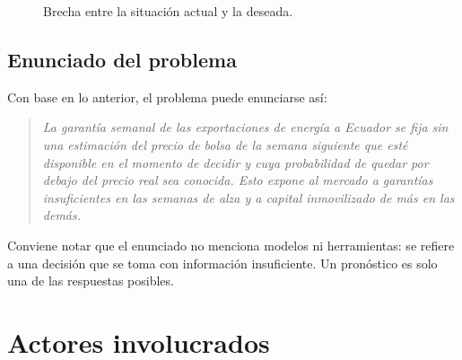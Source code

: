 \documentclass[11pt,letterpaper]{article}
\begin{document}
\begin{figure}[H]
\centering
{}
\caption{Brecha entre la situación actual y la deseada.}
\label{fig:brecha}
\end{figure}

\subsection{Enunciado del problema}

Con base en lo anterior, el problema puede enunciarse así:

\begin{quote}
\itshape
La garantía semanal de las exportaciones de energía a Ecuador se fija
sin una estimación del precio de bolsa de la semana siguiente que esté
disponible en el momento de decidir y cuya probabilidad de quedar por
debajo del precio real sea conocida. Esto expone al mercado a garantías
insuficientes en las semanas de alza y a capital inmovilizado de más en
las demás.
\end{quote}

Conviene notar que el enunciado no menciona modelos ni herramientas: se
refiere a una decisión que se toma con información insuficiente. Un
pronóstico es solo una de las respuestas posibles.

\section{Actores involucrados}
\label{sec:actores}
\end{document}
